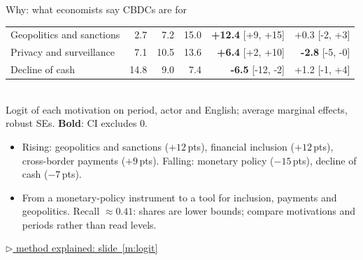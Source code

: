 \documentclass[aspectratio=169,10pt]{beamer}
\newcommand{\method}[1]{\hfill\hyperref[#1]{\tiny\textcolor{c4}{$\triangleright$ method explained: slide~\ref*{#1}}}}
\begin{document}
\begin{frame}{Why: what economists say CBDCs are for}
\begin{tabular}{@{}p{}rrrrr@{}}
Geopolitics and sanctions & \cellcolor{c1!4}2.7 & \cellcolor{c1!10}7.2 & \cellcolor{c1!22}15.0 & \textbf{+12.4} \tiny[+9, +15] & {+0.3} \tiny[-2, +3] \\
Privacy and surveillance & \cellcolor{c1!10}7.1 & \cellcolor{c1!15}10.5 & \cellcolor{c1!20}13.6 & \textbf{+6.4} \tiny[+2, +10] & \textbf{-2.8} \tiny[-5, -0] \\
Decline of cash & \cellcolor{c1!22}14.8 & \cellcolor{c1!13}9.0 & \cellcolor{c1!11}7.4 & \textbf{-6.5} \tiny[-12, -2] & {+1.2} \tiny[-1, +4] \\
\bottomrule\end{tabular}\\[3pt]
Logit of each motivation on period, actor and English; average marginal effects, robust SEs. \textbf{Bold}: CI excludes 0.
\begin{itemize}\setlength\itemsep{0pt}
\item \alert{Rising:} geopolitics and sanctions ($+12$\,pts), financial inclusion ($+12$\,pts), cross-border payments ($+9$\,pts). \quad \alert{Falling:} monetary policy ($-15$\,pts), decline of cash ($-7$\,pts).
\item From a \alert{monetary-policy instrument} to a tool for \alert{inclusion, payments and geopolitics}. Recall $\approx 0.41$: shares are \alert{lower bounds}; compare motivations and periods rather than read levels.
\end{itemize}
\method{m:logit}
\end{frame}
\end{document}
